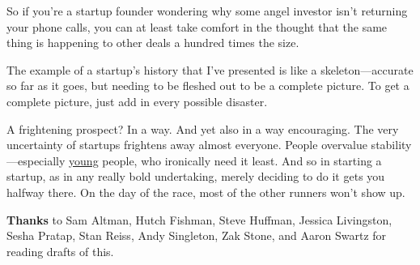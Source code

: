 So if you're a startup founder wondering why some angel investor isn't
returning your phone calls, you can at least take comfort in the thought
that the same thing is happening to other deals a hundred times the
size.

The example of a startup's history that I've presented is like a
skeleton---accurate so far as it goes, but needing to be fleshed out to
be a complete picture. To get a complete picture, just add in every
possible disaster.

A frightening prospect? In a way. And yet also in a way encouraging. The
very uncertainty of startups frightens away almost everyone. People
overvalue stability---especially \href{hiring.html}{young} people, who
ironically need it least. And so in starting a startup, as in any really
bold undertaking, merely deciding to do it gets you halfway there. On
the day of the race, most of the other runners won't show up.


\textbf{Thanks} to Sam Altman, Hutch Fishman, Steve Huffman, Jessica
Livingston, Sesha Pratap, Stan Reiss, Andy Singleton, Zak Stone, and
Aaron Swartz for reading drafts of this.